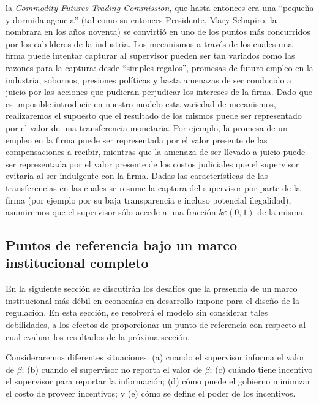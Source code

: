 \documentclass[
  12pt,
  spanish,
]{book}
\begin{document}
\begin{enumerate}
  la \emph{Commodity Futures Trading Commission}, que hasta entonces era una ``pequeña y dormida agencia'' (tal como su entonces Presidente, Mary Schapiro, la nombrara en los años noventa) se convirtió en uno de los puntos más concurridos por los cabilderos de la industria.
  Los mecanismos a través de los cuales una firma puede intentar capturar al supervisor pueden ser tan variados como las razones para la captura: desde ``simples regalos'', promesas de futuro empleo en la industria, sobornos, presiones políticas y hasta amenazas de ser conducido a juicio por las acciones que pudieran perjudicar los intereses de la firma.
  Dado que es imposible introducir en nuestro modelo esta variedad de mecanismos, realizaremos el supuesto que el resultado de los mismos puede ser representado por el valor de una transferencia monetaria. Por ejemplo, la promesa de un empleo en la firma puede ser representada por el valor presente de las compensaciones a recibir, mientras
  que la amenaza de ser llevado a juicio puede ser representada por el valor presente de los costos judiciales que el supervisor evitaría al ser indulgente con la firma. Dadas las características de las transferencias en las cuales se resume la captura del supervisor por parte de la firma (por ejemplo por su baja transparencia e incluso potencial ilegalidad), asumiremos que el supervisor sólo accede a una fracción \(k ε (0,1)\) de la misma.
\end{enumerate}

\hypertarget{puntos-de-referencia-bajo-un-marco-institucional-completo}{%
\subsection{Puntos de referencia bajo un marco institucional completo}\label{puntos-de-referencia-bajo-un-marco-institucional-completo}}

En la siguiente sección se discutirán los desafíos que la presencia de un marco institucional más débil en economías en desarrollo impone para el diseño de la regulación. En esta sección, se resolverá el modelo sin considerar tales debilidades, a los efectos de proporcionar un punto de referencia con respecto al cual evaluar los resultados de la próxima sección.

Consideraremos diferentes situaciones: (a) cuando el supervisor informa el valor de \(β\); (b) cuando el supervisor no reporta el valor de \(β\); (c) cuándo tiene incentivo el supervisor para reportar la información; (d) cómo puede el gobierno minimizar el costo de proveer incentivos; y (e) cómo se define el poder de los incentivos.
\end{document}
